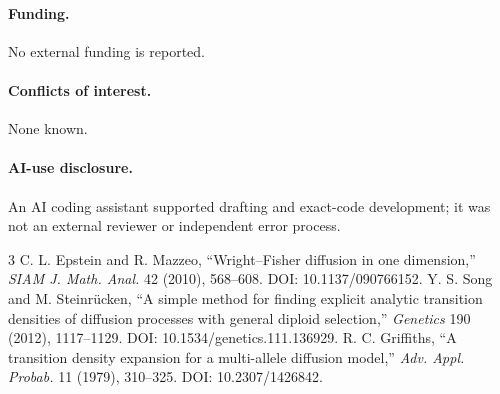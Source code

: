 \documentclass[9pt]{extarticle}
\begin{document}
\paragraph{Funding.} No external funding is reported.
\paragraph{Conflicts of interest.} None known.
\paragraph{AI-use disclosure.} An AI coding assistant supported drafting and
exact-code development; it was not an external reviewer or independent error
process.

\begin{thebibliography}{3}
 C. L. Epstein and R. Mazzeo, ``Wright--Fisher diffusion in one
dimension,'' \emph{SIAM J. Math. Anal.} 42 (2010), 568--608.
DOI: 10.1137/090766152.
 Y. S. Song and M. Steinrücken, ``A simple method for finding
explicit analytic transition densities of diffusion processes with general
diploid selection,'' \emph{Genetics} 190 (2012), 1117--1129.
DOI: 10.1534/genetics.111.136929.
 R. C. Griffiths, ``A transition density expansion for a
multi-allele diffusion model,'' \emph{Adv. Appl. Probab.} 11 (1979), 310--325.
DOI: 10.2307/1426842.
\end{thebibliography}
\end{document}
